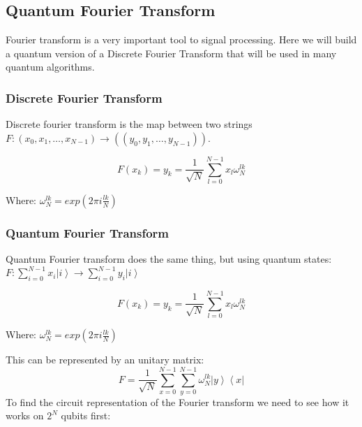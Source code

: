 \subsection{Quantum Fourier Transform}
\label{subsec: QFT}

Fourier transform is a very important tool to signal processing. Here we will build a quantum version of a Discrete Fourier Transform that will be used in many quantum algorithms.

\subsubsection{Discrete Fourier Transform}
\label{Subsubsec: DFT}

Discrete fourier transform is the map between two strings $F: (x_0, x_1, \dots, x_{N-1}) \rightarrow ((y_0, y_1, \dots, y_{N-1}))$.

\begin{equation}
F(x_k) = y_k = \frac{1}{\sqrt N} \sum_{l=0}^{N-1} x_l \omega_N^{lk}
\end{equation}

Where: $\omega_N^{lk} =  exp\left(2\pi i \frac{lk}{N}\right)$

\subsubsection{Quantum Fourier Transform}
\label{Subsubsec: QFT}
Quantum Fourier transform does the same thing, but using quantum states: $F:\sum_{i=0}^{N-1} x_i\left| i \right> \rightarrow \sum_{i=0}^{N-1} y_i\left| i \right> $

\begin{equation}
F(x_k) = y_k = \frac{1}{\sqrt N} \sum_{l=0}^{N-1} x_l \omega_N^{lk}
\end{equation}

Where: $\omega_N^{lk} =  exp\left(2\pi i \frac{lk}{N}\right)$

This can be represented by an unitary matrix:
\begin{equation}
F = \frac{1}{\sqrt N} \sum_{x=0}^{N-1}\sum_{y=0}^{N-1} \omega_N^{lk}  \left| y \right> \left< x \right|
\end{equation}
To find the circuit representation of the Fourier transform we need to see how it works on $2^N$ qubits first:

